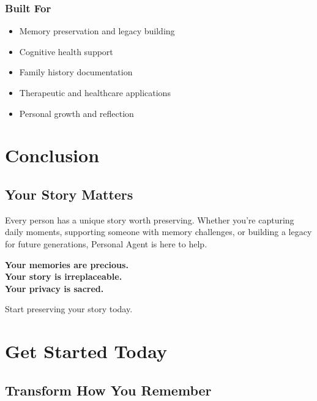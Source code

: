 \documentclass[11pt,letterpaper]{article}
\begin{document}
\subsubsection{Built For}
\begin{itemize}[leftmargin=*]
    \item \textcolor{secondarygreen}{\checkmark} Memory preservation and legacy building
    \item \textcolor{secondarygreen}{\checkmark} Cognitive health support
    \item \textcolor{secondarygreen}{\checkmark} Family history documentation
    \item \textcolor{secondarygreen}{\checkmark} Therapeutic and healthcare applications
    \item \textcolor{secondarygreen}{\checkmark} Personal growth and reflection
\end{itemize}



\newpage
\section{Conclusion}

\subsection{Your Story Matters}

Every person has a unique story worth preserving. Whether you're capturing daily moments, supporting someone with memory challenges, or building a legacy for future generations, Personal Agent is here to help.

\begin{center}
\Large
\textbf{Your memories are precious.}\\
\textbf{Your story is irreplaceable.}\\
\textbf{Your privacy is sacred.}
\end{center}

\vspace{1cm}

\begin{center}
\large
Start preserving your story today.
\end{center}

\newpage
\section{Get Started Today}

\subsection{Transform How You Remember}
\end{document}
